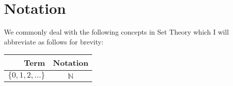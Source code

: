 \section{Notation}

We commonly deal with the following concepts in Set Theory
which I will abbreviate as follows for brevity:
\begin{center}
    \begin{tabular}{ | r | c | }
        \hline
        Term & Notation \\
        \hline \hline
        $\{0, 1, 2, \ldots\}$ & $\mathbb{N}$ \\
        \hline
    \end{tabular}
\end{center}